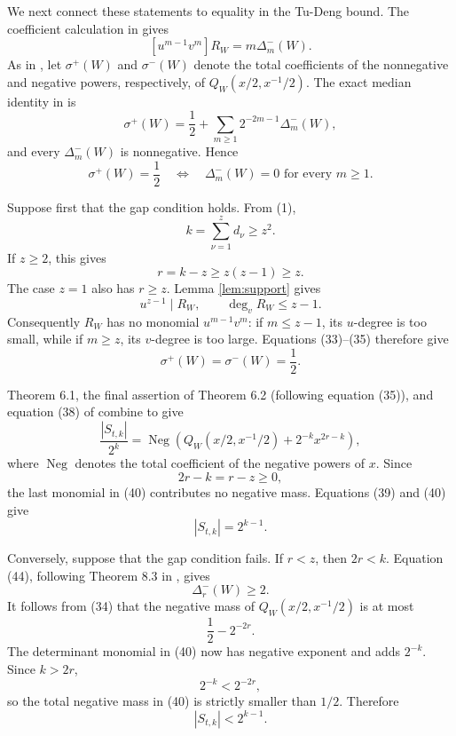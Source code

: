 \documentclass[10pt,a4paper]{article}
\newcommand{\Neg}{\operatorname{Neg}}
\begin{document}
We next connect these statements to equality in the Tu-Deng bound.
The coefficient calculation in \cite[proof of Theorem 5.2]{Proof} gives
\[
 [u^{m-1}v^m]R_W=m\Delta_m^-(W).                            \tag{33}
\]
As in \cite[equation (39)]{Proof}, let $\sigma^+(W)$ and
$\sigma^-(W)$ denote the total coefficients of the nonnegative and
negative powers, respectively, of $Q_W(x/2,x^{-1}/2)$.  The exact
median identity in \cite[Lemma 8.2, equation (41)]{Proof} is
\[
 \sigma^+(W)=\frac12+
       \sum_{m\geq1}2^{-2m-1}\Delta_m^-(W),                 \tag{34}
\]
and every $\Delta_m^-(W)$ is nonnegative.  Hence
\[
 \sigma^+(W)=\frac12
 \quad\Longleftrightarrow\quad
 \Delta_m^-(W)=0\text{ for every }m\geq1.                  \tag{35}
\]

Suppose first that the gap condition holds.  From (1),
\[
                         k=\sum_{\nu=1}^{z}d_\nu\geq z^2.   \tag{36}
\]
If $z\geq2$, this gives
\[
                         r=k-z\geq z(z-1)\geq z.             \tag{37}
\]
The case $z=1$ also has $r\geq z$.  Lemma \ref{lem:support}
gives
\[
                  u^{z-1}\mid R_W,
                  \qquad \deg_vR_W\leq z-1.                \tag{38}
\]
Consequently $R_W$ has no monomial $u^{m-1}v^m$: if
$m\leq z-1$, its $u$-degree is too small, while if $m\geq z$,
its $v$-degree is too large.  Equations (33)--(35) therefore give
\[
                         \sigma^+(W)=\sigma^-(W)=\frac12.   \tag{39}
\]

Theorem 6.1, the final assertion of Theorem 6.2 (following equation (35)),
and equation (38) of \cite{Proof} combine to give
\[
 \frac{|S_{t,k}|}{2^k}
 =\Neg\left(
       Q_W(x/2,x^{-1}/2)+2^{-k}x^{2r-k}
           \right),                                        \tag{40}
\]
where $\Neg$ denotes the total coefficient of the negative powers of
$x$.  Since
\[
                         2r-k=r-z\geq0,                     \tag{41}
\]
the last monomial in (40) contributes no negative mass.  Equations
(39) and (40) give
\[
                         |S_{t,k}|=2^{k-1}.                  \tag{42}
\]

Conversely, suppose that the gap condition fails.  If $r<z$, then
$2r<k$.  Equation (44), following Theorem 8.3 in \cite{Proof}, gives
\[
                         \Delta_r^-(W)\geq2.                 \tag{43}
\]
It follows from (34) that the negative mass of
$Q_W(x/2,x^{-1}/2)$ is at most
\[
                         \frac12-2^{-2r}.
\]
The determinant monomial in (40) now has negative exponent and adds
$2^{-k}$.  Since $k>2r$,
\[
                         2^{-k}<2^{-2r},
\]
so the total negative mass in (40) is strictly smaller than $1/2$.
Therefore
\[
                         |S_{t,k}|<2^{k-1}.                  \tag{44}
\]
\end{document}
